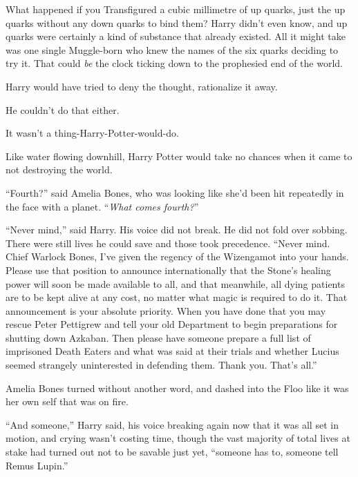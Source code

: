 What happened if you Transfigured a cubic millimetre of up quarks, just the up quarks without any down quarks to bind them? Harry didn’t even know, and up quarks were certainly a kind of substance that already existed. All it might take was one single Muggle-born who knew the names of the six quarks deciding to try it. That could \emph{be} the clock ticking down to the prophesied end of the world.

Harry would have tried to deny the thought, rationalize it away.

He couldn’t do that either.

It wasn’t a thing-Harry-Potter-would-do.

Like water flowing downhill, Harry Potter would take no chances when it came to not destroying the world.

“Fourth?” said Amelia Bones, who was looking like she’d been hit repeatedly in the face with a planet. “\emph{What comes fourth?}”

“Never mind,” said Harry. His voice did not break. He did not fold over sobbing. There were still lives he could save and those took precedence. “Never mind. Chief Warlock Bones, I’ve given the regency of the Wizengamot into your hands. Please use that position to announce internationally that the Stone’s healing power will soon be made available to all, and that meanwhile, all dying patients are to be kept alive at any cost, no matter what magic is required to do it. That announcement is your absolute priority. When you have done that you may rescue Peter Pettigrew and tell your old Department to begin preparations for shutting down Azkaban. Then please have someone prepare a full list of imprisoned Death Eaters and what was said at their trials and whether Lucius seemed strangely uninterested in defending them. Thank you. That’s all.”

Amelia Bones turned without another word, and dashed into the Floo like it was her own self that was on fire.

“And someone,” Harry said, his voice breaking again now that it was all set in motion, and crying wasn’t costing time, though the vast majority of total lives at stake had turned out not to be savable just yet, “someone has to, someone tell Remus Lupin.”

